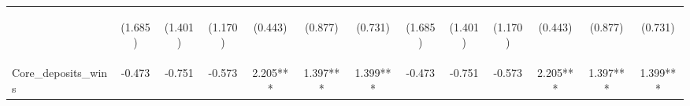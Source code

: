 \documentclass[]{article}
\begin{document}
\begin{center}
\begin{tabular}{lcccccccccccc}
\vspace{4pt} & \begin{footnotesize}(1.685)\end{footnotesize} & \begin{footnotesize}(1.401)\end{footnotesize} & \begin{footnotesize}(1.170)\end{footnotesize} & \begin{footnotesize}(0.443)\end{footnotesize} & \begin{footnotesize}(0.877)\end{footnotesize} & \begin{footnotesize}(0.731)\end{footnotesize} & \begin{footnotesize}(1.685)\end{footnotesize} & \begin{footnotesize}(1.401)\end{footnotesize} & \begin{footnotesize}(1.170)\end{footnotesize} & \begin{footnotesize}(0.443)\end{footnotesize} & \begin{footnotesize}(0.877)\end{footnotesize} & \begin{footnotesize}(0.731)\end{footnotesize} \\
Core\_deposits\_wins & -0.473 & -0.751 & -0.573 & 2.205*** & 1.397*** & 1.399*** & -0.473 & -0.751 & -0.573 & 2.205*** & 1.397*** & 1.399*** \\

\end{tabular}
\end{center}
\end{document}
